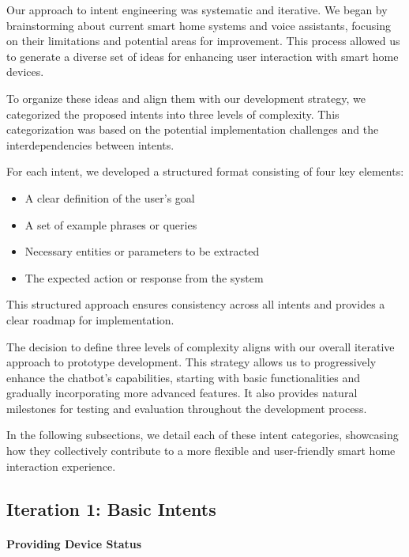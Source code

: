 Our approach to intent engineering was systematic and iterative. We began by brainstorming about current smart home systems and voice assistants, focusing on their limitations and potential areas for improvement. This process allowed us to generate a diverse set of ideas for enhancing user interaction with smart home devices.

To organize these ideas and align them with our development strategy, we categorized the proposed intents into three levels of complexity. This categorization was based on the potential implementation challenges and the interdependencies between intents.

For each intent, we developed a structured format consisting of four key elements:
\begin{itemize}
    \item A clear definition of the user's goal
    \item A set of example phrases or queries
    \item Necessary entities or parameters to be extracted
    \item The expected action or response from the system
\end{itemize}

This structured approach ensures consistency across all intents and provides a clear roadmap for implementation.

The decision to define three levels of complexity aligns with our overall iterative approach to prototype development. This strategy allows us to progressively enhance the chatbot's capabilities, starting with basic functionalities and gradually incorporating more advanced features. It also provides natural milestones for testing and evaluation throughout the development process.

In the following subsections, we detail each of these intent categories, showcasing how they collectively contribute to a more flexible and user-friendly smart home interaction experience.

\subsection{Iteration 1: Basic Intents}

\paragraph{Providing Device Status}

